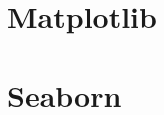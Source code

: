 \documentclass[10pt,compress]{beamer} %
\begin{document}
\section{Matplotlib}
\section{Seaborn}



	
\end{document}
